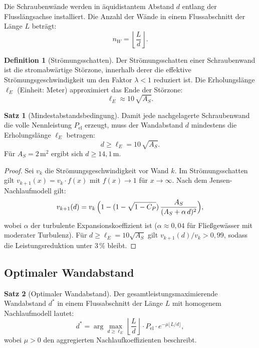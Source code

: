 ﻿\documentclass[a4paper,12pt]{article}
\theoremstyle{definition}
\newtheorem{definition}{Definition}
\newtheorem{satz}{Satz}
\begin{document}
Die Schraubenwände werden in äquidistantem Abstand $d$ entlang der Flusslängsachse
installiert. Die Anzahl der Wände in einem Flussabschnitt der Länge $L$ beträgt:
\[
  n_W = \left\lfloor \frac{L}{d} \right\rfloor.
\]

\begin{definition}[Strömungsschatten]
Der Strömungsschatten einer Schraubenwand ist die stromabwärtige Störzone, innerhalb
derer die effektive Strömungsgeschwindigkeit um den Faktor $\lambda < 1$ reduziert ist.
Die Erholungslänge $\ell_E$ (Einheit: Meter) approximiert das Ende der Störzone:
\[
  \ell_E \approx 10\,\sqrt{A_S}.
\]
\end{definition}

\begin{satz}[Mindestabstandsbedingung]
\label{satz:abstand}
Damit jede nachgelagerte Schraubenwand die volle Nennleistung $P_{\mathrm{el}}$
erzeugt, muss der Wandabstand $d$ mindestens die Erholungslänge $\ell_E$ betragen:
\[
  d \geq \ell_E = 10\,\sqrt{A_S}.
\]
Für $A_S = 2\,\mathrm{m^2}$ ergibt sich $d \geq 14{,}1\,\mathrm{m}$.
\end{satz}

\begin{proof}
Sei $v_k$ die Strömungsgeschwindigkeit vor Wand $k$. Im Strömungsschatten gilt
$v_{k+1}(x) = v_k \cdot f(x)$ mit $f(x) \to 1$ für $x \to \infty$.
Nach dem Jensen-Nachlaufmodell gilt:
\[
  v_{k+1}(d) = v_k\,\Bigl(1 - (1-\sqrt{1-C_P})\,\frac{A_S}{(A_S + \alpha\,d)^2}\Bigr),
\]
wobei $\alpha$ der turbulente Expansionskoeffizient ist ($\alpha \approx 0{,}04$
für Fließgewässer mit moderater Turbulenz). Für $d \geq \ell_E = 10\sqrt{A_S}$ gilt
$v_{k+1}(d)/v_k > 0{,}99$, sodass die Leistungsreduktion unter $3\,\%$ bleibt. \qedhere
\end{proof}

\subsection{Optimaler Wandabstand}

\begin{satz}[Optimaler Wandabstand]
\label{satz:optabstand}
Der gesamtleistungsmaximierende Wandabstand $d^*$ in einem Flussabschnitt der Länge
$L$ mit homogenem Nachlaufmodell lautet:
\[
  d^* = \arg\max_{d \geq \ell_E} \left\lfloor\frac{L}{d}\right\rfloor \cdot
        P_{\mathrm{el}} \cdot e^{-\mu \lfloor L/d \rfloor},
\]
wobei $\mu > 0$ den aggregierten Nachlaufkoeffizienten beschreibt.
\end{satz}
\end{document}
